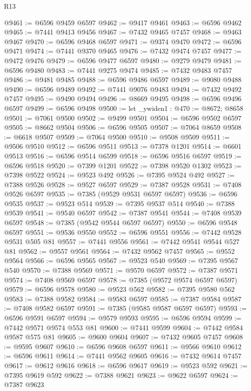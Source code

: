 \begin{lexlean}{R13}
\begin{coremodule}
@9461 := @6596 @9459 @6597
@9462 := @9417 @9461
@9463 := @6596 @9462
@9465 := @7441 @9413 @9456
@9467 := @7432 @9465 @7457
@9468 := @9463 @9467
@9470 := @6596 @9468 @6597
@9471 := @9374 @9470
@9472 := @6596 @9471
@9474 := @7441 @9370 @9465
@9476 := @7432 @9474 @7457
@9477 := @9472 @9476
@9479 := @6596 @9477 @6597
@9480 := @9279 @9479
@9481 := @6596 @9480
@9483 := @7441 @9275 @9474
@9485 := @7432 @9483 @7457
@9486 := @9481 @9485
@9488 := @6596 @9486 @6597
@9489 := @9080 @9488
@9490 := @6596 @9489
@9492 := @7441 @9076 @9483
@9494 := @7432 @9492 @7457
@9495 := @9490 @9494
@9496 := @8669 @9495
@9498 := @6596 @9496 @6597
@9499 := @6596 @9498
@9500 := let _ywiden1 : @470 := @8672; @8658
@9501 := @7061 @9500
@9502 := @9499 @9501
@9504 := @6596 @9502 @6597
@9505 := @8662 @9504
@9506 := @6596 @9505
@9507 := @7064 @8659
@9508 := @6618 @9507
@9509 := @7064 @9500
@9510 := @9508 @9509
@9511 := @9506 @9510
@9512 := @6596 @9511
@9513 := @7378 @1201
@9514 := @6601 @9513
@9516 := @6596 @9514 @6599
@9518 := @6596 @9516 @6597
@9519 := @6596 @9518
@9520 := @7399 @1201
@9522 := @7398 @9520 @1302
@9523 := @7398 @9522
@9524 := @9523 @492
@9526 := @7395 @9524 @492
@9527 := @7388 @9526
@9528 := @9527 @6597
@9529 := @7387 @9528
@9531 := @7408 @9526 @6597
@9535 := @7385 (@9529 @9531 @6597 @6597)
@9536 := @6596 @9535
@9537 := @9523 @514
@9539 := @7395 @9537 @514
@9540 := @7388 @9539
@9541 := @9540 @6597
@9542 := @7387 @9541
@9544 := @7408 @9539 @6597
@9548 := @7385 (@9542 @9544 @6597 @6597)
@9550 := @6596 @9548 @6597
@9551 := @9536 @9550
@9552 := @6596 @9551
@9556 := @7442 @9528 @9531 @505 @81
@9557 := @7441 @9556
@9561 := @7442 @9541 @9544 @527 @81
@9562 := @9557 @9561
@9564 := @7432 @9562 @7457
@9565 := @9552 @9564
@9566 := @6596 @9565
@9567 := @9523 @540
@9569 := @7395 @9567 @540
@9570 := @7388 @9569
@9571 := @9570 @6597
@9572 := @7387 @9571
@9574 := @7408 @9569 @6597
@9578 := @7385 (@9572 @9574 @6597 @6597)
@9579 := @6596 @9578
@9580 := @9523 @562
@9582 := @7395 @9580 @562
@9583 := @7388 @9582
@9584 := @9583 @6597
@9585 := @7387 @9584
@9587 := @7408 @9582 @6597
@9591 := @7385 (@9585 @9587 @6597 @6597)
@9593 := @6596 @9591 @6597
@9594 := @9579 @9593
@9595 := @6596 @9594
@9599 := @7442 @9571 @9574 @553 @81
@9600 := @7441 @9599
@9604 := @7442 @9584 @9587 @575 @81
@9605 := @9600 @9604
@9607 := @7432 @9605 @7457
@9608 := @9595 @9607
@9610 := @6596 @9608 @6597
@9611 := @9566 @9610
@9612 := @6596 @9611
@9614 := @7441 @9562 @9605
@9616 := @7432 @9614 @7457
@9617 := @9612 @9616
@9618 := @6596 @9617
@9619 := @9523 @592
@9621 := @7395 @9619 @592
@9622 := @7388 @9621
@9623 := @9622 @6597
@9624 := @7387 @9623

\end{coremodule}
\end{lexlean}
